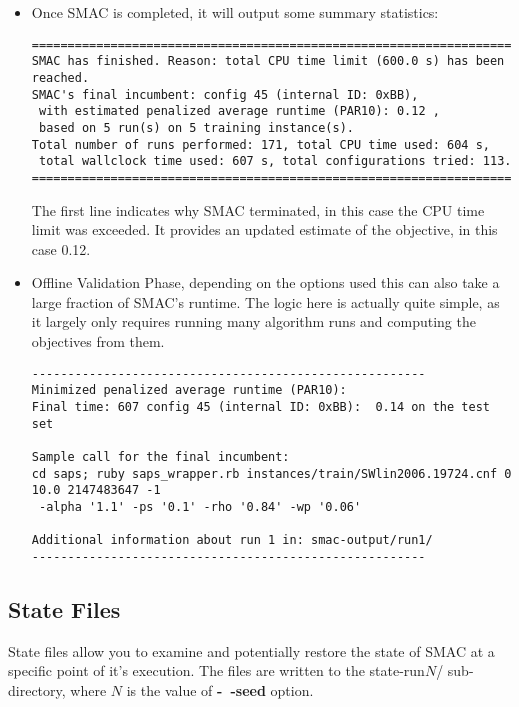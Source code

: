 \documentclass[manual.tex]{subfiles}
\begin{document}
\begin{itemize}
\item 
Once SMAC is completed, it will output some summary statistics:

\scriptsize{
\begin{verbatim}
=======================================================================================
SMAC has finished. Reason: total CPU time limit (600.0 s) has been reached.   
SMAC's final incumbent: config 45 (internal ID: 0xBB), 
 with estimated penalized average runtime (PAR10): 0.12 ,
 based on 5 run(s) on 5 training instance(s).
Total number of runs performed: 171, total CPU time used: 604 s,
 total wallclock time used: 607 s, total configurations tried: 113.
=======================================================================================
\end{verbatim}
}
\normalsize
The first line indicates why SMAC terminated, in this case the CPU time limit
was exceeded. It provides an updated estimate of the objective, in this case 0.12. 

\item Offline Validation Phase, depending on the options used this can also take a large fraction of SMAC's runtime. The logic here is actually quite simple, as it largely only requires running many algorithm runs and computing the objectives from them.

\scriptsize{
\begin{verbatim}
-------------------------------------------------------
Minimized penalized average runtime (PAR10):
Final time: 607 config 45 (internal ID: 0xBB):  0.14 on the test set

Sample call for the final incumbent:
cd saps; ruby saps_wrapper.rb instances/train/SWlin2006.19724.cnf 0 10.0 2147483647 -1
 -alpha '1.1' -ps '0.1' -rho '0.84' -wp '0.06'

Additional information about run 1 in: smac-output/run1/
-------------------------------------------------------
\end{verbatim}
}
\normalsize

\end{itemize}

\subsection{State Files}\label{subsec:state-files}

State files allow you to examine and potentially restore the state of SMAC at a specific point of it's execution. The files are written to the state-run$N$/ sub-directory, where $N$ is the value of \textbf{-~$\!$-seed} option. 
\end{document}
